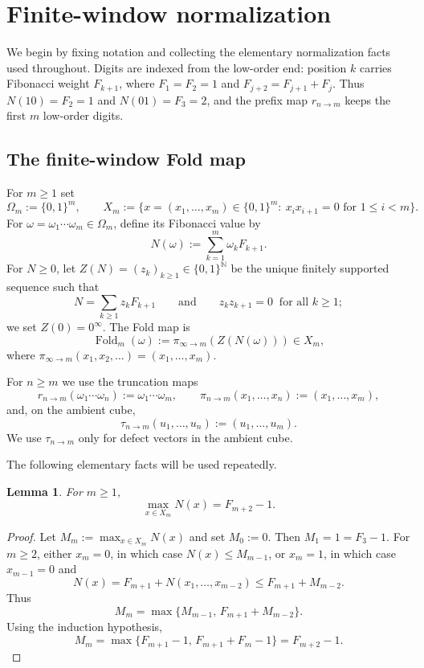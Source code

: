 \documentclass[11pt,reqno]{amsart}
\numberwithin{equation}{section}
\theoremstyle{plain}
\newtheorem{lemma}[theorem]{Lemma}
\theoremstyle{definition}
\theoremstyle{remark}
\newcommand{\NN}{\mathbb{N}}
\DeclareMathOperator{\Fold}{Fold}
\begin{document}
\section{Finite-window normalization}
\label{sec:adjacent}

We begin by fixing notation and collecting the elementary normalization facts
used throughout.  Digits are indexed from the low-order end: position $k$
carries Fibonacci weight $F_{k+1}$, where $F_1=F_2=1$ and
$F_{j+2}=F_{j+1}+F_j$.  Thus $N(10)=F_2=1$ and $N(01)=F_3=2$, and the prefix
map $r_{n\to m}$ keeps the first $m$ low-order digits.

\subsection{The finite-window Fold map}

For $m\ge 1$ set
\[
\Omega_m:=\{0,1\}^m,
\qquad
X_m:=\{x=(x_1,\dots,x_m)\in\{0,1\}^m:\ x_ix_{i+1}=0\text{ for }1\le i<m\}.
\]
For $\omega=\omega_1\cdots\omega_m\in\Omega_m$, define its Fibonacci value by
\[
N(\omega):=\sum_{k=1}^m\omega_kF_{k+1}.
\]
For $N\ge 0$, let $Z(N)=(z_k)_{k\ge 1}\in\{0,1\}^{\NN}$ be the unique finitely
supported sequence such that
\[
N=\sum_{k\ge 1}z_kF_{k+1}
\qquad\text{and}\qquad
z_kz_{k+1}=0\ \text{ for all }k\ge 1;
\]
we set $Z(0)=0^\infty$.  The Fold map is
\[
\Fold_m(\omega):=\pi_{\infty\to m}(Z(N(\omega)))\in X_m,
\]
where $\pi_{\infty\to m}(x_1,x_2,\dots)=(x_1,\dots,x_m)$.

For $n\ge m$ we use the truncation maps
\[
r_{n\to m}(\omega_1\cdots\omega_n):=\omega_1\cdots\omega_m,
\qquad
\pi_{n\to m}(x_1,\dots,x_n):=(x_1,\dots,x_m),
\]
and, on the ambient cube,
\[
\tau_{n\to m}(u_1,\dots,u_n):=(u_1,\dots,u_m).
\]
We use $\tau_{n\to m}$ only for defect vectors in the ambient cube.

The following elementary facts will be used repeatedly.

\begin{lemma}
\label{lem:max-prefix-value}
For $m\ge 1$,
\[
\max_{x\in X_m}N(x)=F_{m+2}-1.
\]
\end{lemma}

\begin{proof}
Let $M_m:=\max_{x\in X_m}N(x)$ and set $M_0:=0$.  Then $M_1=1=F_3-1$.  For
$m\ge 2$, either $x_m=0$, in which case $N(x)\le M_{m-1}$, or $x_m=1$, in
which case $x_{m-1}=0$ and
\[
N(x)=F_{m+1}+N(x_1,\dots,x_{m-2})\le F_{m+1}+M_{m-2}.
\]
Thus
\[
M_m=\max\{M_{m-1},\,F_{m+1}+M_{m-2}\}.
\]
Using the induction hypothesis,
\[
M_m=\max\{F_{m+1}-1,\,F_{m+1}+F_m-1\}=F_{m+2}-1.
\]
\end{proof}
\end{document}
